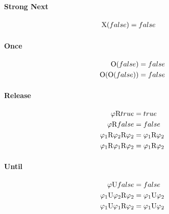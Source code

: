 \paragraph{Strong Next}
\begin{align}
	\text{X}(false) &= false
\end{align} 

\paragraph{Once}
\begin{align}
	\text{O}(false) &= false \\
	\text{O}(\text{O}(false)) &= false
\end{align} 

\paragraph{Release}
\begin{align}
	\varphi \text{R} true &= true \\
	\varphi \text{R} false &= false \\ 
	\varphi_1 \text{R} \varphi_2 \text{R} \varphi_2 &= \varphi_1 \text{R} \varphi_2 \\ 
	\varphi_1 \text{R} \varphi_1 \text{R} \varphi_2 &= \varphi_1 \text{R} \varphi_2 
\end{align} 

\paragraph{Until}
\begin{align}
	\varphi \text{U} false &= false \\ 
	\varphi_1 \text{U} \varphi_2 \text{R} \varphi_2 &= \varphi_1 \text{U} \varphi_2 \\ 
	\varphi_1 \text{U} \varphi_1 \text{R} \varphi_2 &= \varphi_1 \text{U} \varphi_2 
\end{align}

